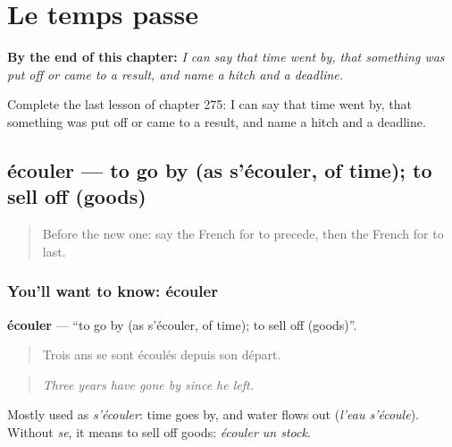 
\chapter{Le temps passe}
\label{ch:fr-le-temps-passe}

\begin{chapteropening}
\textbf{By the end of this chapter:} \emph{I can say that time went by, that something was put off or came to a result, and name a hitch and a deadline.}

Complete the last lesson of chapter 275: I can say that time went by, that something was put off or came to a result, and name a hitch and a deadline.
\end{chapteropening}

\section[écouler]{écouler — to go by (as s'écouler, of time); to sell off (goods)}

\label{lesson:FR-C275-ecouler}



\begin{quote}
Before the new one: say the French for to precede, then the French for to last.
\end{quote}

\subsection*{You'll want to know: écouler}
\textbf{écouler} — \textquotedblleft{}to go by (as s'écouler, of time); to sell off (goods)\textquotedblright{}.

\begin{quote}
Trois ans se sont écoulés depuis son départ.
\end{quote}

\begin{quote}
\emph{Three years have gone by since he left.}
\end{quote}

Mostly used as \emph{s'écouler}: time goes by, and water flows out (\emph{l'eau s'écoule}). Without \emph{se}, it means to sell off goods: \emph{écouler un stock}.

